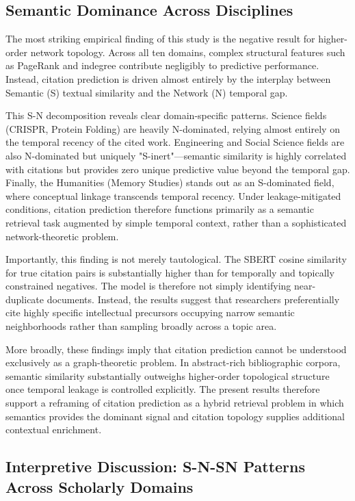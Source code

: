 \documentclass[11pt,a4paper]{article}
\begin{document}
\subsection{Semantic Dominance Across Disciplines}

The most striking empirical finding of this study is the negative result for higher-order network topology. Across all ten domains, complex structural features such as PageRank and indegree contribute negligibly to predictive performance. Instead, citation prediction is driven almost entirely by the interplay between Semantic (S) textual similarity and the Network (N) temporal gap.

This S-N decomposition reveals clear domain-specific patterns. Science fields (CRISPR, Protein Folding) are heavily N-dominated, relying almost entirely on the temporal recency of the cited work. Engineering and Social Science fields are also N-dominated but uniquely "S-inert"—semantic similarity is highly correlated with citations but provides zero unique predictive value beyond the temporal gap. Finally, the Humanities (Memory Studies) stands out as an S-dominated field, where conceptual linkage transcends temporal recency. Under leakage-mitigated conditions, citation prediction therefore functions primarily as a semantic retrieval task augmented by simple temporal context, rather than a sophisticated network-theoretic problem.

Importantly, this finding is not merely tautological. The SBERT cosine similarity for true citation pairs is substantially higher than for temporally and topically constrained negatives. The model is therefore not simply identifying near-duplicate documents. Instead, the results suggest that researchers preferentially cite highly specific intellectual precursors occupying narrow semantic neighborhoods rather than sampling broadly across a topic area.

More broadly, these findings imply that citation prediction cannot be understood exclusively as a graph-theoretic problem. In abstract-rich bibliographic corpora, semantic similarity substantially outweighs higher-order topological structure once temporal leakage is controlled explicitly. The present results therefore support a reframing of citation prediction as a hybrid retrieval problem in which semantics provides the dominant signal and citation topology supplies additional contextual enrichment.

\subsection{Interpretive Discussion: S-N-SN Patterns Across Scholarly Domains}
\end{document}
